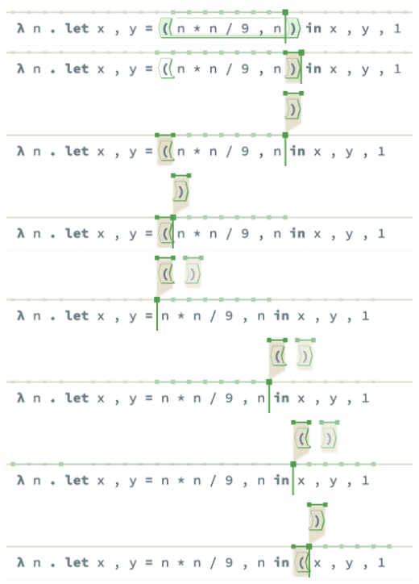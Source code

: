 \begin{center}
  \includegraphics[width=\columnwidth]{img/multi-restructure-0.png}
  \includegraphics[width=\columnwidth]{img/multi-restructure-1.png}
  \includegraphics[width=\columnwidth]{img/multi-restructure-2.png}
  \includegraphics[width=\columnwidth]{img/multi-restructure-3.png}
  \includegraphics[width=\columnwidth]{img/multi-restructure-4.png}
  \includegraphics[width=\columnwidth]{img/multi-restructure-5.png}
  \includegraphics[width=\columnwidth]{img/multi-restructure-6.png}
  \includegraphics[width=\columnwidth]{img/multi-restructure-7.png}

\end{center}
